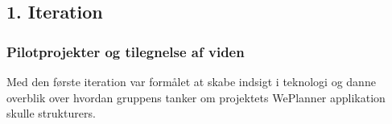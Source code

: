 \subsection{1. Iteration}

\subsubsection{Pilotprojekter og tilegnelse af viden}

Med den første iteration var formålet at skabe indsigt i teknologi og danne overblik over hvordan gruppens tanker om projektets WePlanner applikation skulle strukturers. 